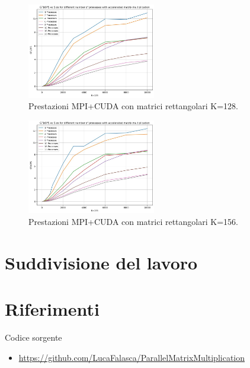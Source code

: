 \documentclass[conference]{IEEEtran}
\begin{document}
\begin{figure}
    \centering
    \includegraphics[width=0.5\textwidth]{resources/mpi_cuda_128.jpg}
    \caption{Prestazioni MPI+CUDA con matrici rettangolari K=128.}
    \label{fig:mpi_cuda_128}
\end{figure}
\begin{figure}
    \centering
    \includegraphics[width=0.5\textwidth]{resources/mpi_cuda_156.jpg}
    \caption{Prestazioni MPI+CUDA con matrici rettangolari K=156.}
    \label{fig:mpi_cuda_156}
\end{figure}
\section{Suddivisione del lavoro}
\section{Riferimenti}
Codice sorgente
\begin{itemize}
    \item \href{https://github.com/LucaFalasca/ParallelMatrixMultiplication}{https://github.com/LucaFalasca/ParallelMatrixMultiplication}
\end{itemize}
\vspace{12pt}
\end{document}
